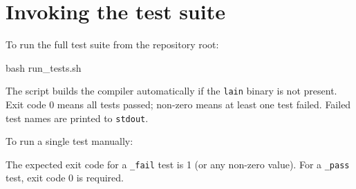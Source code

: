 \section{Invoking the test suite}
\label{sec:test-invoke}

\pnum
To run the full test suite from the repository root:

\begin{ccode}
bash run_tests.sh
\end{ccode}

\pnum
The script builds the compiler automatically if the \texttt{lain} binary is not
present.  Exit code 0 means all tests passed; non-zero means at least one test
failed.  Failed test names are printed to \texttt{stdout}.

\pnum
To run a single test manually:


\pnum
The expected exit code for a \texttt{\_fail} test is 1 (or any non-zero value).
For a \texttt{\_pass} test, exit code 0 is required.

